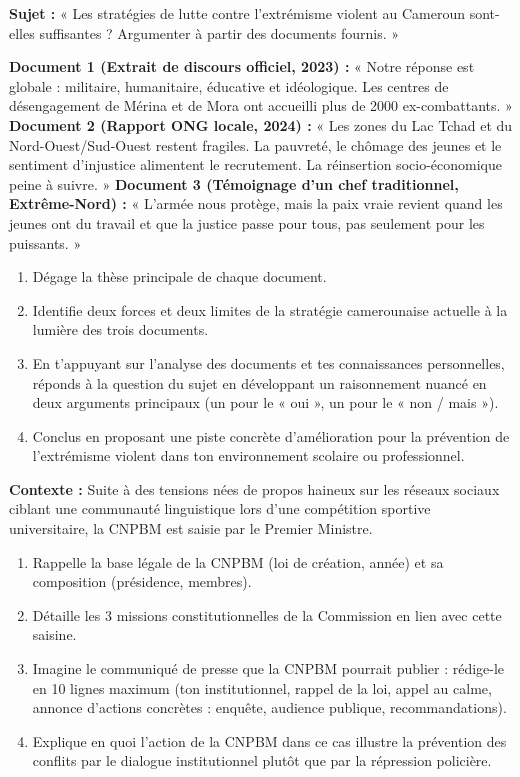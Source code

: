 \documentclass[11pt]{article}
\begin{document}
\begin{exercice}
\textbf{Sujet :} « Les stratégies de lutte contre l'extrémisme violent au Cameroun sont-elles suffisantes ? Argumenter à partir des documents fournis. »

\textbf{Document 1 (Extrait de discours officiel, 2023) :} « Notre réponse est globale : militaire, humanitaire, éducative et idéologique. Les centres de désengagement de Mérina et de Mora ont accueilli plus de 2000 ex-combattants. »
\textbf{Document 2 (Rapport ONG locale, 2024) :} « Les zones du Lac Tchad et du Nord-Ouest/Sud-Ouest restent fragiles. La pauvreté, le chômage des jeunes et le sentiment d'injustice alimentent le recrutement. La réinsertion socio-économique peine à suivre. »
\textbf{Document 3 (Témoignage d'un chef traditionnel, Extrême-Nord) :} « L'armée nous protège, mais la paix vraie revient quand les jeunes ont du travail et que la justice passe pour tous, pas seulement pour les puissants. »

\begin{enumerate}
\item Dégage la thèse principale de chaque document.
\item Identifie deux forces et deux limites de la stratégie camerounaise actuelle à la lumière des trois documents.
\item En t'appuyant sur l'analyse des documents et tes connaissances personnelles, réponds à la question du sujet en développant un raisonnement nuancé en deux arguments principaux (un pour le « oui », un pour le « non / mais »).
\item Conclus en proposant une piste concrète d'amélioration pour la prévention de l'extrémisme violent dans ton environnement scolaire ou professionnel.
\end{enumerate}
\end{exercice}

\begin{exercice}
\textbf{Contexte :} Suite à des tensions nées de propos haineux sur les réseaux sociaux ciblant une communauté linguistique lors d'une compétition sportive universitaire, la CNPBM est saisie par le Premier Ministre.
\begin{enumerate}
\item Rappelle la base légale de la CNPBM (loi de création, année) et sa composition (présidence, membres).
\item Détaille les 3 missions constitutionnelles de la Commission en lien avec cette saisine.
\item Imagine le communiqué de presse que la CNPBM pourrait publier : rédige-le en 10 lignes maximum (ton institutionnel, rappel de la loi, appel au calme, annonce d'actions concrètes : enquête, audience publique, recommandations).
\item Explique en quoi l'action de la CNPBM dans ce cas illustre la prévention des conflits par le dialogue institutionnel plutôt que par la répression policière.
\end{enumerate}
\end{exercice}
\end{document}
